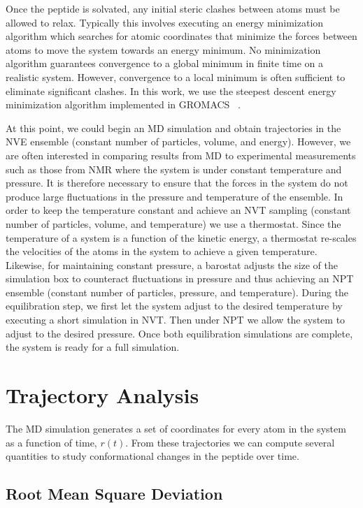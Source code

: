Once the peptide is solvated, any initial steric clashes between atoms must be allowed to relax. Typically this involves executing an energy minimization algorithm which searches for atomic coordinates that minimize the forces between atoms to move the system towards an energy minimum. No minimization algorithm guarantees convergence to a global minimum in finite time on a realistic system. However, convergence to a local minimum is often sufficient to eliminate significant clashes. In this work, we use the steepest descent energy minimization algorithm implemented in GROMACS ~\cite{hess2008gromacs}. 

At this point, we could begin an MD simulation and obtain trajectories in the NVE ensemble (constant number of particles, volume, and energy). However, we are often interested in comparing results from MD to experimental measurements such as those from NMR where the system is under constant temperature and pressure. It is therefore necessary to ensure that the forces in the system do not produce large fluctuations in the pressure and temperature of the ensemble. In order to keep the temperature constant and achieve an NVT sampling (constant number of particles, volume, and temperature) we use a thermostat. Since the temperature of a system is a function of the kinetic energy, a thermostat re-scales the velocities of the atoms in the system to achieve a given temperature. Likewise, for maintaining constant pressure, a barostat adjusts the size of the simulation box to counteract fluctuations in pressure and thus achieving an NPT ensemble (constant number of particles, pressure, and temperature). During the equilibration step, we first let the system adjust to the desired temperature by executing a short simulation in NVT. Then under NPT we allow the system to adjust to the desired pressure. Once both equilibration simulations are complete, the system is ready for a full simulation.

\section{Trajectory Analysis}

The MD simulation generates a set of coordinates for every atom in the system as a function of time, $r(t)$. From these trajectories we can compute several quantities to study conformational changes in the peptide over time. 

\subsection{Root Mean Square Deviation}

